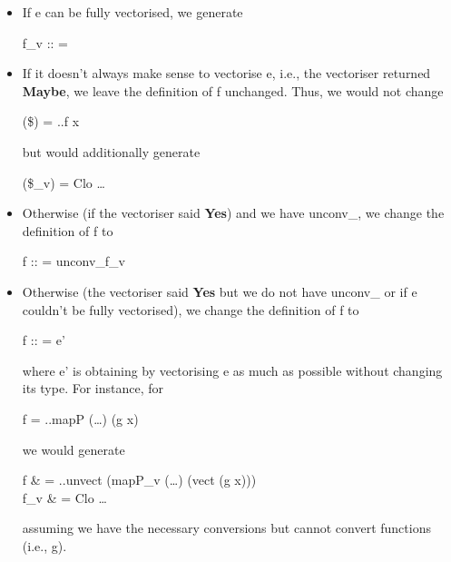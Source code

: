 \documentclass{article}
\begin{document}
\begin{itemize}
\item If \<e\> can be fully vectorised, we generate
\begin{haskell}
f_v :: \vect{\sigma} = 
\end{haskell}

\item If it doesn't always make sense to vectorise \<e\>, i.e., the vectoriser
returned \textbf{Maybe}, we leave the definition of \<f\> unchanged. Thus, we
would not change
\begin{haskell}
({\$}) = ..f x
\end{haskell}
but would additionally generate
\begin{haskell}
({\$}_v) = Clo \ldots
\end{haskell}

\item Otherwise (if the vectoriser said \textbf{Yes}) and we have
\<unconv_\sigma\>, we change the definition of \<f\> to
\begin{haskell}
f :: \sigma = unconv_\sigma f_v
\end{haskell}

\item Otherwise (the vectoriser said \textbf{Yes} but we do not have
\<unconv_\sigma\> or if \<e\> couldn't be fully vectorised), we change the
definition of \<f\> to
\begin{haskell}
f :: \sigma = e'
\end{haskell}
where \<e'\> is obtaining by vectorising \<e\> as much as possible without
changing its type. For instance, for
\begin{haskell}
f = ..mapP (\ldots) (g x)
\end{haskell}
we would generate
\begin{haskell}
f & = ..unvect (mapP_v (\ldots) (vect (g x))) \\
f_v & = Clo \ldots
\end{haskell}
assuming we have the necessary conversions but cannot convert functions (i.e.,
\<g\>).
\end{itemize}
\end{document}
